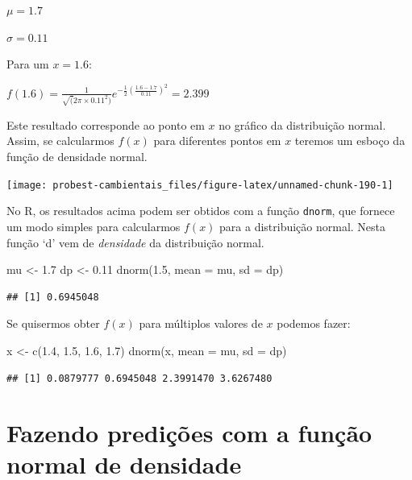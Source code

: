 \documentclass[
]{book}
\newenvironment{Shaded}{\begin{snugshade}}{\end{snugshade}}
\newcommand{\AttributeTok}[1]{\textcolor[rgb]{0.77,0.63,0.00}{#1}}
\newcommand{\FloatTok}[1]{\textcolor[rgb]{0.00,0.00,0.81}{#1}}
\newcommand{\FunctionTok}[1]{\textcolor[rgb]{0.00,0.00,0.00}{#1}}
\newcommand{\NormalTok}[1]{#1}
\newcommand{\OtherTok}[1]{\textcolor[rgb]{0.56,0.35,0.01}{#1}}
\begin{document}
\(\mu = 1.7\)

\(\sigma = 0.11\)

Para um \(x = 1.6\):

\(f(1.6) = \frac{1}{\sqrt(2\pi \times0.11^2)}e^{-\frac{1}{2}(\frac{1.6 - 1.7}{0.11})^2} = 2.399\)

Este resultado corresponde ao ponto em \(x\) no gráfico da distribuição normal. Assim, se calcularmos \(f(x)\) para diferentes pontos em \(x\) teremos um esboço da função de densidade normal.

\begin{center}\texttt{[image: probest-cambientais\_files/figure-latex/unnamed-chunk-190-1]} \end{center}

No R, os resultados acima podem ser obtidos com a função \texttt{dnorm}, que fornece um modo simples para calcularmos \(f(x)\) para a distribuição normal. Nesta função `d' vem de \emph{densidade} da distribuição normal.

\begin{Shaded}
\begin{Highlighting}[]
\NormalTok{mu }\OtherTok{\textless{}{-}} \FloatTok{1.7}
\NormalTok{dp }\OtherTok{\textless{}{-}} \FloatTok{0.11}
\FunctionTok{dnorm}\NormalTok{(}\FloatTok{1.5}\NormalTok{, }\AttributeTok{mean =}\NormalTok{ mu, }\AttributeTok{sd =}\NormalTok{ dp)}
\end{Highlighting}
\end{Shaded}

\begin{verbatim}
## [1] 0.6945048
\end{verbatim}

Se quisermos obter \(f(x)\) para múltiplos valores de \(x\) podemos fazer:

\begin{Shaded}
\begin{Highlighting}[]
\NormalTok{x }\OtherTok{\textless{}{-}} \FunctionTok{c}\NormalTok{(}\FloatTok{1.4}\NormalTok{, }\FloatTok{1.5}\NormalTok{, }\FloatTok{1.6}\NormalTok{, }\FloatTok{1.7}\NormalTok{)}
\FunctionTok{dnorm}\NormalTok{(x, }\AttributeTok{mean =}\NormalTok{ mu, }\AttributeTok{sd =}\NormalTok{ dp)}
\end{Highlighting}
\end{Shaded}

\begin{verbatim}
## [1] 0.0879777 0.6945048 2.3991470 3.6267480
\end{verbatim}

\hypertarget{fazendo-prediuxe7uxf5es-com-a-funuxe7uxe3o-normal-de-densidade}{%
\section{Fazendo predições com a função normal de densidade}\label{fazendo-prediuxe7uxf5es-com-a-funuxe7uxe3o-normal-de-densidade}}
\end{document}
